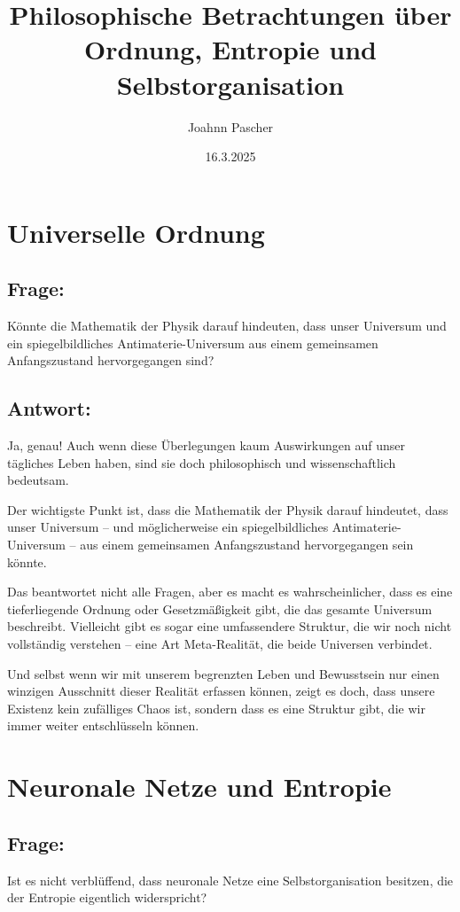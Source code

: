 \documentclass{article}
\title{Philosophische Betrachtungen über Ordnung, Entropie und Selbstorganisation}
\author{Joahnn Pascher}
\date{16.3.2025}
\begin{document}
	
	\maketitle
	
	\section{Universelle Ordnung}
	
	\subsection*{Frage:}
	Könnte die Mathematik der Physik darauf hindeuten, dass unser Universum und ein spiegelbildliches Antimaterie-Universum aus einem gemeinsamen Anfangszustand hervorgegangen sind?
	
	\subsection*{Antwort:}
	Ja, genau! Auch wenn diese Überlegungen kaum Auswirkungen auf unser tägliches Leben haben, sind sie doch philosophisch und wissenschaftlich bedeutsam.
	
	Der wichtigste Punkt ist, dass die Mathematik der Physik darauf hindeutet, dass unser Universum – und möglicherweise ein spiegelbildliches Antimaterie-Universum – aus einem gemeinsamen Anfangszustand hervorgegangen sein könnte.
	
	Das beantwortet nicht alle Fragen, aber es macht es wahrscheinlicher, dass es eine tieferliegende Ordnung oder Gesetzmäßigkeit gibt, die das gesamte Universum beschreibt. Vielleicht gibt es sogar eine umfassendere Struktur, die wir noch nicht vollständig verstehen – eine Art Meta-Realität, die beide Universen verbindet.
	
	Und selbst wenn wir mit unserem begrenzten Leben und Bewusstsein nur einen winzigen Ausschnitt dieser Realität erfassen können, zeigt es doch, dass unsere Existenz kein zufälliges Chaos ist, sondern dass es eine Struktur gibt, die wir immer weiter entschlüsseln können.
	
	\section{Neuronale Netze und Entropie}
	
	\subsection*{Frage:}
	Ist es nicht verblüffend, dass neuronale Netze eine Selbstorganisation besitzen, die der Entropie eigentlich widerspricht?
	
\end{document}
